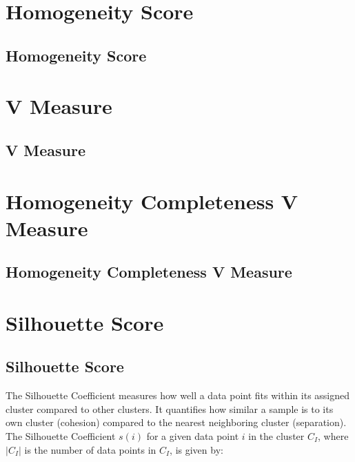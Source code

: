 \clearpage
\thispagestyle{clusteringstyle}
\section{Homogeneity Score}
\subsection{Homogeneity Score}

\clearpage
\thispagestyle{clusteringstyle}
\section{V Measure}
\subsection{V Measure}

\clearpage
\thispagestyle{clusteringstyle}
\section{Homogeneity Completeness V Measure}
\subsection{Homogeneity Completeness V Measure}

\clearpage
\thispagestyle{clusteringstyle}
\section{Silhouette Score}
\subsection{Silhouette Score}

The Silhouette Coefficient measures how well a data point fits within its assigned cluster compared to other clusters. 
It quantifies how similar a sample is to its own cluster (cohesion) compared to the nearest neighboring cluster (separation).
The Silhouette Coefficient $s(i)$ for a given data point $i$ in the cluster $C_I$, where $|C_I|$ is the number of data points in $C_I$, is given by:

\begin{center}
\end{center}

